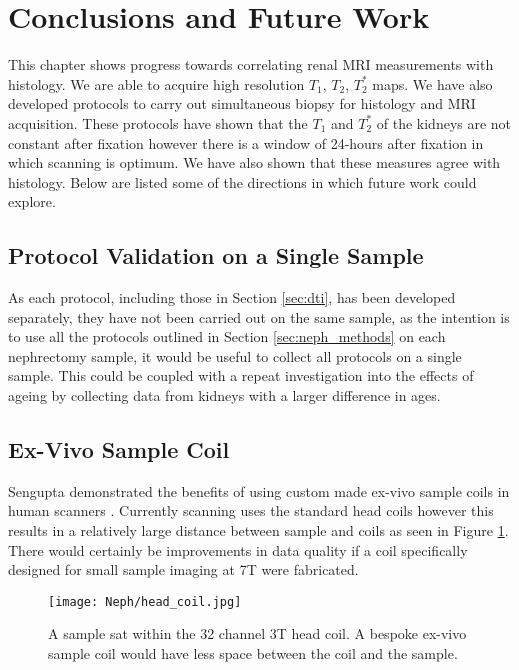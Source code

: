 \section{Conclusions and Future Work}

This chapter shows progress towards correlating renal \ac{MRI} measurements with histology. We are able to acquire high resolution $T_1$, $T_2$, $T_2^*$ maps. We have also developed protocols to carry out simultaneous biopsy for histology and \ac{MRI} acquisition. These protocols have shown that the $T_1$ and $T_2^*$ of the kidneys are not constant after fixation however there is a window of 24-hours after fixation in which scanning is optimum. We have also shown that these measures agree with histology. Below are listed some of the directions in which future work could explore.

\subsection{Protocol Validation on a Single Sample}

As each protocol, including those in Section \ref{sec:dti}, has been developed separately, they have not been carried out on the same sample, as the intention is to use all the protocols outlined in Section \ref{sec:neph_methods} on each nephrectomy sample, it would be useful to collect all protocols on a single sample. This could be coupled with a repeat investigation into the effects of ageing by collecting data from kidneys with a larger difference in ages.

\subsection{Ex-Vivo Sample Coil}
Sengupta demonstrated the benefits of using custom made ex-vivo sample coils in human scanners \cite{sengupta_high_2017}. Currently scanning uses the standard head coils however this results in a relatively large distance between sample and coils as seen in Figure \ref{fig:head_coil}. There would certainly be improvements in data quality if a coil specifically designed for small sample imaging at 7T were fabricated.
\begin{figure}[H]
	\centering
	\texttt{[image: Neph/head\_coil.jpg]}
	\caption{A sample sat within the 32 channel 3T head coil. A bespoke ex-vivo sample coil would have less space between the coil and the sample.}
	\label{fig:head_coil}	
\end{figure}

